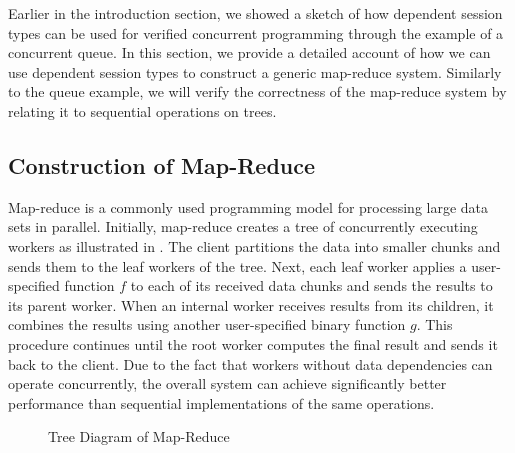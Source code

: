Earlier in the introduction section, we showed a sketch of how dependent session types
can be used for verified concurrent programming through the example of a concurrent queue.
In this section, we provide a detailed account of how we can use dependent session types
to construct a generic map-reduce system. Similarly to the queue example, we will verify
the correctness of the map-reduce system by relating it to sequential operations on trees.

\subsection{Construction of Map-Reduce}
Map-reduce is a commonly used programming model for processing large data sets in parallel.
Initially, map-reduce creates a tree of concurrently executing workers as illustrated in
. The client partitions the data into smaller chunks and sends them to
the leaf workers of the tree. Next, each leaf worker applies a user-specified
function $f$ to each of its received data chunks and sends the results to its parent worker.
When an internal worker receives results from its children, it combines the results using another
user-specified binary function $g$. This procedure continues until the root worker computes
the final result and sends it back to the client. Due to the fact that workers without
data dependencies can operate concurrently, the overall system can achieve significantly better
performance than sequential implementations of the same operations.
\vspace{-0.3em}
\begin{figure}[H]
\vspace{-0.8em}
\caption{Tree Diagram of Map-Reduce}
\label{fig:map-reduce}
\end{figure}
\vspace{-0.8em}


